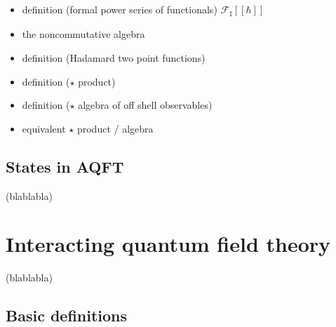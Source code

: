 \documentclass[10pt]{book}
\newcommand{\Fcal}{\mathcal{F}}
\theoremstyle{break}
\begin{document}
\begin{itemize}
\item definition (formal power series of functionals) $\Fcal_\sharp[[\hbar]]$
\item the noncommutative algebra
\item definition (Hadamard two point functions)
\item definition ($\star$ product)
\item definition ($\star$ algebra of off shell observables)
\item equivalent $\star$ product / algebra
\end{itemize}


\section{States in AQFT}


(blablabla)


\chapter{Interacting quantum field theory}


(blablabla)


\section{Basic definitions}
\end{document}

